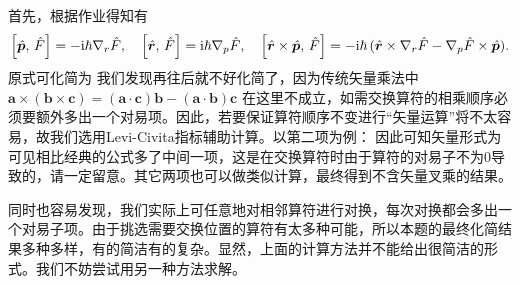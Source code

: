\begin{enumerate}[label=2.\Alph*, leftmargin=-0.5mm]
首先，根据作业得知有
\[\qty[\hat{\boldsymbol{p}},\,\hat{F}] = -\mathrm{i}\hbar\nabla_r\hat{F},\quad
\qty[\hat{\boldsymbol{r}},\,\hat{F}] = \mathrm{i}\hbar \nabla_p\hat{F},\quad
\qty[\hat{\boldsymbol{r}}\times\hat{\boldsymbol{p}},\,\hat{F}] = -\mathrm{i}\hbar\,(\hat{\boldsymbol{r}}\times\nabla_r\hat{F} - \nabla_p\hat{F}\times\hat{\boldsymbol{p}}).\]
原式可化简为
我们发现再往后就不好化简了，因为传统矢量乘法中
$\bm{a}\times(\bm{b}\times\bm{c}) = (\bm{a}\cdot\bm{c})\bm{b}-(\bm{a}\cdot\bm{b})\bm{c}$
在这里不成立，如需交换算符的相乘顺序必须要额外多出一个对易项。因此，若要保证算符顺序不变进行“矢量运算”将不太容易，故我们选用Levi-Civita指标辅助计算。以第二项为例：
因此可知矢量形式为
{\color{red}可见相比经典的公式多了中间一项，这是在交换算符时由于算符的对易子不为0导致的，请一定留意。}其它两项也可以做类似计算，最终得到不含矢量叉乘的结果。

同时也容易发现，我们实际上可任意地对相邻算符进行对换，每次对换都会多出一个对易子项。由于挑选需要交换位置的算符有太多种可能，所以本题的最终化简结果多种多样，有的简洁有的复杂。显然，上面的计算方法并不能给出很简洁的形式。我们不妨尝试用另一种方法求解。


\end{enumerate}
